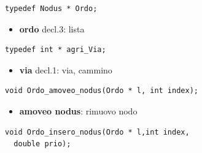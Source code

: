 \documentclass[8pt]{book}
\begin{document}
\begin{spacing}{0.9}
  \begin{small}
    \begin{tcolorbox}
\begin{verbatim}
typedef Nodus * Ordo;
\end{verbatim}
  \end{tcolorbox}
    \end{small}
      \end{spacing}

\begin{itemize}

\item
  \textbf{ordo} decl.3: lista
\end{itemize}

\begin{spacing}{0.9}
  \begin{small}
    \begin{tcolorbox}
\begin{verbatim}
typedef int * agri_Via;
\end{verbatim}
  \end{tcolorbox}
    \end{small}
      \end{spacing}

\begin{itemize}

\item
  \textbf{via} decl.1: via, cammino
\end{itemize}

\begin{spacing}{0.9}
  \begin{small}
    \begin{tcolorbox}
\begin{verbatim}
void Ordo_amoveo_nodus(Ordo * l, int index);
\end{verbatim}
  \end{tcolorbox}
    \end{small}
      \end{spacing}

\begin{itemize}

\item
  \textbf{amoveo nodus}: rimuovo nodo
\end{itemize}

\begin{spacing}{0.9}
  \begin{small}
    \begin{tcolorbox}
\begin{verbatim}
void Ordo_insero_nodus(Ordo * l,int index,
  double prio);
\end{verbatim}
  \end{tcolorbox}
    \end{small}
      \end{spacing}
\end{document}
